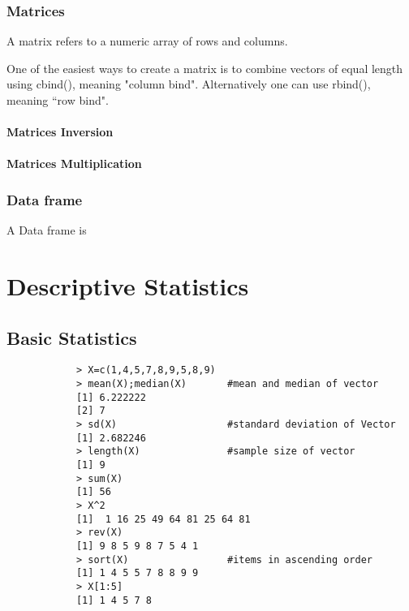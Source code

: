 \documentclass[a4paper,12pt]{article}
\begin{document}
\begin{itemize}
		
		\subsection{Matrices}
		A matrix refers to a numeric array of rows and columns.
		
		One of the easiest ways to create a matrix is to combine vectors of equal
		length using cbind(), meaning "column bind". Alternatively one can use rbind(), meaning ``row bind".
		
		
		\subsubsection{Matrices Inversion}
		\subsubsection{Matrices Multiplication}
		
		
		\subsection{Data frame}
		A Data frame is
		\newpage
		
		
		\chapter{Descriptive Statistics}
		
		\section{Basic Statistics}
		
		\large
		\begin{framed}
			\begin{verbatim}
			> X=c(1,4,5,7,8,9,5,8,9)
			> mean(X);median(X)       #mean and median of vector
			[1] 6.222222
			[2] 7
			> sd(X)                   #standard deviation of Vector
			[1] 2.682246
			> length(X)               #sample size of vector
			[1] 9
			> sum(X)
			[1] 56
			> X^2
			[1]  1 16 25 49 64 81 25 64 81
			> rev(X)
			[1] 9 8 5 9 8 7 5 4 1
			> sort(X)                 #items in ascending order
			[1] 1 4 5 5 7 8 8 9 9
			> X[1:5]
			[1] 1 4 5 7 8
			\end{verbatim}
		\end{framed}
		\large
		

\end{itemize}
\end{document}

